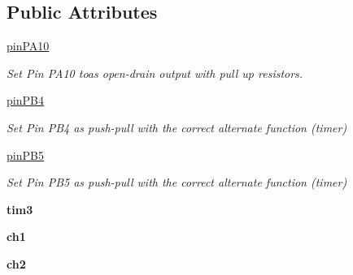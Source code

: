 \subsection*{Public Attributes}
\begin{DoxyCompactItemize}
\item 
\hyperlink{classmotor_1_1MotorDriver_a3ae9c38ecb6a4a631419afae85ca0731}{pin\+P\+A10}\hypertarget{classmotor_1_1MotorDriver_a3ae9c38ecb6a4a631419afae85ca0731}{}\label{classmotor_1_1MotorDriver_a3ae9c38ecb6a4a631419afae85ca0731}

\begin{DoxyCompactList}\small\item\em Set Pin P\+A10 toas open-\/drain output with pull up resistors. \end{DoxyCompactList}\item 
\hyperlink{classmotor_1_1MotorDriver_a42ee72cc8b59874f4fcfdc5757703f3a}{pin\+P\+B4}\hypertarget{classmotor_1_1MotorDriver_a42ee72cc8b59874f4fcfdc5757703f3a}{}\label{classmotor_1_1MotorDriver_a42ee72cc8b59874f4fcfdc5757703f3a}

\begin{DoxyCompactList}\small\item\em Set Pin P\+B4 as push-\/pull with the correct alternate function (timer) \end{DoxyCompactList}\item 
\hyperlink{classmotor_1_1MotorDriver_a2f60b4e627c81b35db92bba149074e57}{pin\+P\+B5}\hypertarget{classmotor_1_1MotorDriver_a2f60b4e627c81b35db92bba149074e57}{}\label{classmotor_1_1MotorDriver_a2f60b4e627c81b35db92bba149074e57}

\begin{DoxyCompactList}\small\item\em Set Pin P\+B5 as push-\/pull with the correct alternate function (timer) \end{DoxyCompactList}\item 
{\bfseries tim3}\hypertarget{classmotor_1_1MotorDriver_ab91b09598c1e2ef3b1e8b29b20b1604d}{}\label{classmotor_1_1MotorDriver_ab91b09598c1e2ef3b1e8b29b20b1604d}

\item 
{\bfseries ch1}\hypertarget{classmotor_1_1MotorDriver_ab59ff180f9593d716a60d0177cd8564e}{}\label{classmotor_1_1MotorDriver_ab59ff180f9593d716a60d0177cd8564e}

\item 
{\bfseries ch2}\hypertarget{classmotor_1_1MotorDriver_af47581f527f4163d62810c617e081001}{}\label{classmotor_1_1MotorDriver_af47581f527f4163d62810c617e081001}

\end{DoxyCompactItemize}


